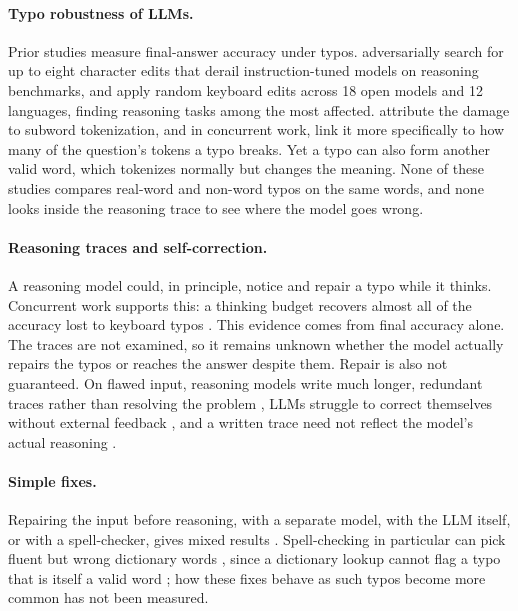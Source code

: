 \documentclass[11pt]{article}
\begin{document}
\paragraph{Typo robustness of LLMs.} Prior studies measure final-answer accuracy under typos. \citet{gan2024} adversarially search for up to eight character edits that derail instruction-tuned models on reasoning benchmarks, and \citet{zhao2026} apply random keyboard edits across 18 open models and 12 languages, finding reasoning tasks among the most affected. \citet{chai2024} attribute the damage to subword tokenization, and in concurrent work, \citet{hu2026} link it more specifically to how many of the question's tokens a typo breaks. Yet a typo can also form another valid word, which tokenizes normally but changes the meaning. None of these studies compares real-word and non-word typos on the same words, and none looks inside the reasoning trace to see where the model goes wrong.

\paragraph{Reasoning traces and self-correction.} A reasoning model could, in principle, notice and repair a typo while it thinks. Concurrent work supports this: a thinking budget recovers almost all of the accuracy lost to keyboard typos \citep{hu2026}. This evidence comes from final accuracy alone. The traces are not examined, so it remains unknown whether the model actually repairs the typos or reaches the answer despite them. Repair is also not guaranteed. On flawed input, reasoning models write much longer, redundant traces rather than resolving the problem \citep{fan2025}, LLMs struggle to correct themselves without external feedback \citep{huang2024}, and a written trace need not reflect the model's actual reasoning \citep{turpin2023}.

\paragraph{Simple fixes.} Repairing the input before reasoning, with a separate model, with the LLM itself, or with a spell-checker, gives mixed results \citep{pruthi2019,wang2024,mu2026,zhu2026}. Spell-checking in particular can pick fluent but wrong dictionary words \citep{zhu2026}, since a dictionary lookup cannot flag a typo that is itself a valid word \citep{kukich1992}; how these fixes behave as such typos become more common has not been measured.
\end{document}
